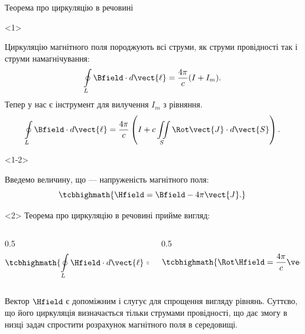 \documentclass[onlytextwidth]{beamer}
\begin{document}
\begin{frame}{Теорема про циркуляцію в речовині}{}
	\begin{onlyenv}
		\begin{block}{}\justifying
			Циркуляцію магнітного поля породжують всі струми, як струми провідності так і струми намагнічування:
			\begin{equation*}
				\oint\limits_L\Bfield\cdot d\vect{\ell} = \frac{4\pi}c(I + I_m).
			\end{equation*}
			Тепер у нас є інструмент для вилучення $I_m$ з рівняння.
			\begin{equation*}
				\oint\limits_L\Bfield\cdot d\vect{\ell} = \frac{4\pi}c\left(I + c
				\iint\limits_S \Rot\vect{J}\cdot d\vect{S}\right).
			\end{equation*}
		\end{block}
	\end{onlyenv}
	\begin{onlyenv}<1-2>
		\begin{block}{}\justifying
			Введемо величину, що --- \alert{напруженість магнітного поля}:
			\begin{equation*}
				\tcbhighmath{\Hfield = \Bfield - 4\pi\vect{J}.}
			\end{equation*}
		\end{block}
	\end{onlyenv}
	\begin{onlyenv}
		Теорема про циркуляцію в речовині прийме вигляд:
		\begin{columns}
			\begin{column}{0.5\linewidth}\centering
				\begin{equation*}
					\tcbhighmath{\oint\limits_L\Hfield\cdot d\vect{\ell} = \frac{4\pi}cI.}
				\end{equation*}
			\end{column}
			\begin{column}{0.5\linewidth}\centering
				\begin{equation*}
					\tcbhighmath{\Rot\Hfield = \frac{4\pi}c\vect{j}.}
				\end{equation*}
			\end{column}
		\end{columns}
		\begin{block}{}\justifying
			Вектор $\Hfield$ є допоміжним і слугує для спрощення вигляду рівнянь. Суттєво, що \alert{його циркуляція визначається тільки струмами провідності},
			що дає змогу в низці задач спростити розрахунок магнітного поля в середовищі.
		\end{block}
	\end{onlyenv}
\end{frame}
\end{document}
